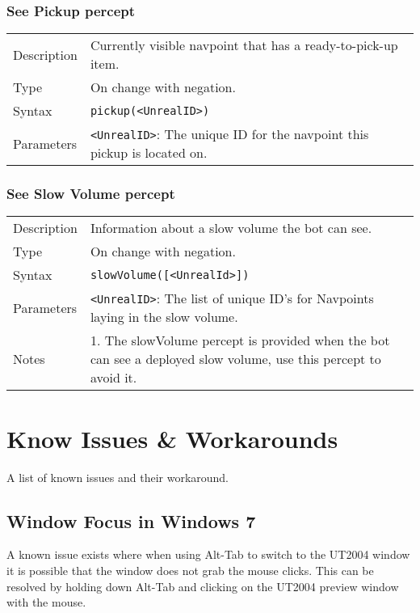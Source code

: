 \documentclass[11pt,a4paper]{article}
\begin{document}
\subsubsection*{See Pickup percept}
\begin{small}
\begin{tabular}{p{2cm}p{9cm}}
Description & Currently visible navpoint that has a ready-to-pick-up item.\\
Type & On change with negation.\\
Syntax & \verb|pickup(<UnrealID>)|\\
Parameters & \verb|<UnrealID>|: The unique ID for the navpoint this pickup is located on.\\
\end{tabular}
\end{small}

\subsubsection*{See Slow Volume percept}
\begin{small}
\begin{tabular}{p{2cm}p{9cm}}
Description & Information about a slow volume the bot can see.\\
Type & On change with negation.\\
Syntax & \verb|slowVolume([<UnrealId>])|\\
Parameters & \verb|<UnrealID>|: The list of unique ID's for Navpoints laying in the slow volume.\\

Notes &
	1.	The slowVolume percept is provided when the bot can see a deployed slow volume, use this percept to avoid it. \\
\end{tabular}
\end{small}


\section{Know Issues \& Workarounds}

A list of known issues and their workaround.

\subsection{Window Focus in Windows 7}

A known issue exists where when using Alt-Tab to switch to the UT2004 window it is possible that the window does not grab the mouse clicks. This can be resolved by holding down Alt-Tab and clicking on the UT2004 preview window with the mouse.
\end{document}

